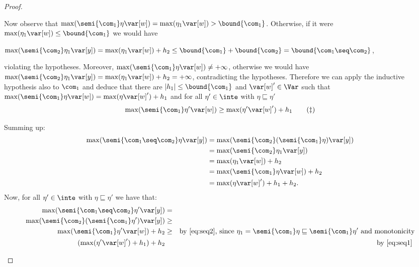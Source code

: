 \begin{proof}
\begin{inductive}
    Now observe that
    \(\max(\semi{\com_1}\eta \var[w]) = \max(\eta_1 \var[w]) >
    \bound{\com_1}\). Otherwise, if it were \(\max(\eta_1 \var[w]) \leq
    \bound{\com_1}\) we would have
    \begin{center}
      \(\max(\semi{\com_2}\eta_1 \var[y]) = \max(\eta_1 \var[w]) + h_2 \leq
      \bound{\com_1} + \bound{\com_2} = \bound{\com_1 \seq \com_2}\),
    \end{center}
    violating the hypotheses. Moreover,
    \(\max(\semi{\com_1}\eta \var[w]) \neq +\infty\), otherwise we
    would have
    \({\max(\semi{\com_2} \eta_1 \var[y])} = {\max(\eta_1 \var[w]) +
      h_2} = + \infty\), contradicting the hypotheses.  Therefore we
    can apply the inductive hypothesis also to \(\com_1\) and deduce
    that there are \(|h_1| \leq \bound{\com_1}\) and
    \(\var[w]' \in \Var\) such that
    \(\max(\semi{\com_1} \eta \var[w]) = \max(\eta \var[w]') + h_1\)
    and for all \(\eta' \in \inte\) with \(\eta \sqsubseteq \eta'\)
    \begin{equation}
      \label{eq:seq1}
      \max(\semi{\com_1} \eta' \var[w]) \geq \max(\eta' \var[w]') + h_1
      \tag{\ddag}
    \end{equation}

    Summing up:
    \begin{align*}
      \max(\semi{\com_1 \seq \com_2}\eta \var[y])
      &= \max(\semi{\com_2}(\semi{\com_1}\eta) \var[y])\\
      & = \max(\semi{\com_2}\eta_1 \var[y])\\
      & = \max(\eta_1 \var[w]) + h_2\\
      & = \max(\semi{\com_1}\eta \var[w]) + h_2\\
      & = \max(\eta \var[w]')+h_1 + h_2.
    \end{align*}
    Now, for all \(\eta' \in \inte\) with \(\eta \sqsubseteq \eta'\) we have that:
    \begin{align*}
      \max(\semi{\com_1 \seq \com_2}\eta' \var[y]) & = & \\ 
      \max(\semi{\com_2}(\semi{\com_1}\eta') \var[y]) & \geq & \\ 
      \max(\semi{\com_1}\eta' \var[w]) + h_2 & \geq & 
                                                      \text{by\ \eqref{eq:seq2}, since } \eta_1 = \semi{\com_1}\eta \sqsubseteq \semi{\com_1}\eta' \text{ and monotonicity} \\
      (\max(\eta' \var[w]') +h_1) + h_2 & & \text{by\ \eqref{eq:seq1}}\
    \end{align*}


\end{inductive}
\end{proof}
